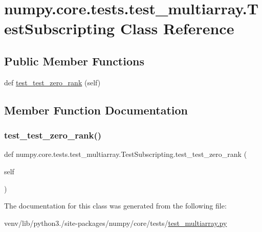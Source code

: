 \hypertarget{classnumpy_1_1core_1_1tests_1_1test__multiarray_1_1TestSubscripting}{}\section{numpy.\+core.\+tests.\+test\+\_\+multiarray.\+Test\+Subscripting Class Reference}
\label{classnumpy_1_1core_1_1tests_1_1test__multiarray_1_1TestSubscripting}
\subsection*{Public Member Functions}
\begin{DoxyCompactItemize}
\item 
def \hyperlink{classnumpy_1_1core_1_1tests_1_1test__multiarray_1_1TestSubscripting_ad9b8091f97ff825d906b643b4f5e3d5d}{test\+\_\+test\+\_\+zero\+\_\+rank} (self)
\end{DoxyCompactItemize}


\subsection{Member Function Documentation}
\mbox{\label{classnumpy_1_1core_1_1tests_1_1test__multiarray_1_1TestSubscripting_ad9b8091f97ff825d906b643b4f5e3d5d}} 
\subsubsection{\texorpdfstring{test\+\_\+test\+\_\+zero\+\_\+rank()}{test\_test\_zero\_rank()}}
{\footnotesize\ttfamily def numpy.\+core.\+tests.\+test\+\_\+multiarray.\+Test\+Subscripting.\+test\+\_\+test\+\_\+zero\+\_\+rank (\begin{DoxyParamCaption}\item[{}]{self }\end{DoxyParamCaption})}



The documentation for this class was generated from the following file\+:\begin{DoxyCompactItemize}
\item 
venv/lib/python3./site-\/packages/numpy/core/tests/\hyperlink{core_2tests_2test__multiarray_8py}{test\+\_\+multiarray.\+py}\end{DoxyCompactItemize}
